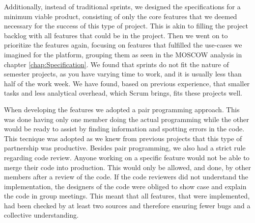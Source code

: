 Additionally, instead of traditional sprints, we designed the specifications for a minimum viable product, consisting of only the core features that we deemed necessary for the success of this type of project. This is akin to filling the project backlog with all features that could be in the project.
Then we went on to prioritize the features again, focusing on features that fulfilled the use-cases we imagined for the platform, grouping them as seen in the MOSCOW analysis in chapter \ref{chap:Specification}.
We found that sprints do not fit the nature of semester projects, as you have varying time to work, and it is usually less than half of the work week. We have found, based on previous experience, that smaller tasks and less analytical overhead, which Scrum brings, fits these projects well\cite{sutherlandScrumArtDoing2014}.

When developing the features we adopted a pair programming approach. This was done having only one member doing the actual programming while the other would be ready to assist by finding information and spotting errors in the code. This tecnique was adopted as we knew from previous projects that this type of partnership was productive. Besides pair programming, we also had a strict rule regarding code review. Anyone working on a specific feature would not be able to merge their code into production. This would only be allowed, and done, by other members after a review of the code. If the code reviewers did not understand the implementation, the designers of the code were obliged to show case and explain the code in group meetings. This meant that all features, that were implemented, had been checked by at least two sources and therefore ensuring fewer bugs and a collective understanding.



